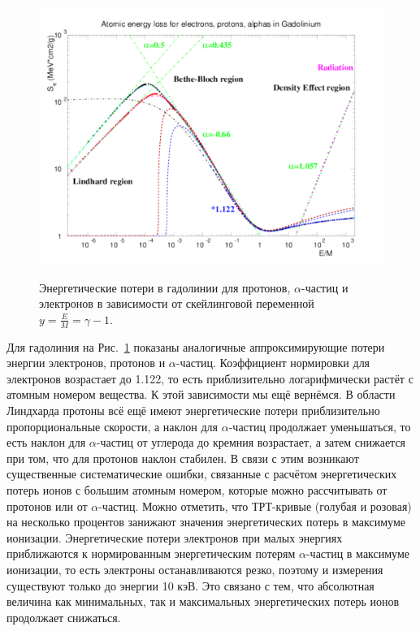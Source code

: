 \documentclass[a4paper,12pt]{article}
\begin{document}
\begin{large}
    \begin{figure}[ht]
    {
       \includegraphics[width=0.99\linewidth]{images/epa_gd_l}
    }
    \caption{Энергетические потери в гадолинии для протонов, $\alpha$-частиц и электронов в зависимости от скейлинговой переменной $y=\frac{E}{M}=\gamma-1$.}
    \label{fig:dEdxGdL}
  \end{figure}
  Для гадолиния на Рис.~\ref{fig:dEdxGdL} показаны аналогичные аппроксимирующие потери энергии электронов, протонов и $\alpha$-частиц.
  Коэффициент нормировки для электронов возрастает до 1.122, то есть приблизительно логарифмически растёт с атомным номером вещества.
  К этой зависимости мы ещё вернёмся.
  В области Линдхарда протоны всё ещё имеют энергетические потери приблизительно пропорциональные скорости, а наклон для $\alpha$-частиц продолжает уменьшаться, то есть наклон для $\alpha$-частиц от углерода до кремния возрастает, а затем снижается при том, что для протонов наклон стабилен.
  В связи с этим возникают существенные систематические ошибки, связанные с расчётом энергетических потерь ионов с большим атомным номером, которые можно рассчитывать от протонов или от $\alpha$-частиц.
  Можно отметить, что ТРТ-кривые (голубая и розовая) на несколько процентов занижают значения энергетических потерь в максимуме ионизации.
  Энергетические потери электронов при малых энергиях приближаются к нормированным энергетическим потерям $\alpha$-частиц в максимуме ионизации, то есть электроны останавливаются резко, поэтому и измерения существуют только до энергии 10 кэВ.
  Это связано с тем, что абсолютная величина как минимальных, так и максимальных энергетических потерь ионов продолжает снижаться.
  

\end{large}
\end{document}
